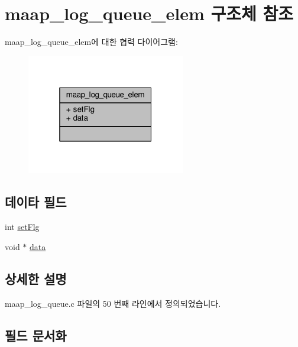 \hypertarget{structmaap__log__queue__elem}{}\section{maap\+\_\+log\+\_\+queue\+\_\+elem 구조체 참조}
\label{structmaap__log__queue__elem}


maap\+\_\+log\+\_\+queue\+\_\+elem에 대한 협력 다이어그램\+:
\nopagebreak
\begin{figure}[H]
\begin{center}
\leavevmode
\includegraphics[width=196pt]{structmaap__log__queue__elem__coll__graph}
\end{center}
\end{figure}
\subsection*{데이타 필드}
\begin{DoxyCompactItemize}
\item 
int \hyperlink{structmaap__log__queue__elem_aa457306deb1979d52675b298626b010b}{set\+Flg}
\item 
void $\ast$ \hyperlink{structmaap__log__queue__elem_a735984d41155bc1032e09bece8f8d66d}{data}
\end{DoxyCompactItemize}


\subsection{상세한 설명}


maap\+\_\+log\+\_\+queue.\+c 파일의 50 번째 라인에서 정의되었습니다.



\subsection{필드 문서화}
